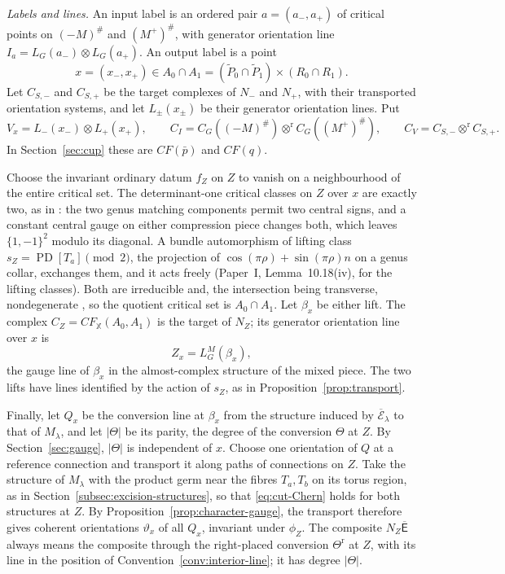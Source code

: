 \documentclass[11pt]{amsart}
\theoremstyle{definition}
\theoremstyle{remark}
\theoremstyle{plain}
\numberwithin{equation}{section}
\newcommand{\CF}{\mathit{CF}}
\newcommand{\PD}{\operatorname{PD}}
\begin{document}
\emph{Labels and lines.} An input label is an ordered pair
$a=(a_-,a_+)$ of critical points on $(-M)^\#$ and $(M^+)^\#$, with
generator orientation line $I_a=L_G(a_-)\otimes L_G(a_+)$. An output label is a
point
\[
 x=(x_-,x_+)\in A_0\cap A_1
   =(\widetilde P_0\cap\widetilde P_1)\times(R_0\cap R_1).
\]
Let $C_{S,-}$ and $C_{S,+}$ be the target complexes of $N_-$ and
$N_+$, with their transported orientation systems, and let
$L_\pm(x_\pm)$ be their generator orientation lines. Put
\[
 V_x=L_-(x_-)\otimes L_+(x_+),\qquad
 C_I=C_G((-M)^\#)\otimes^{\mathrm r}C_G((M^+)^\#),\qquad
 C_V=C_{S,-}\otimes^{\mathrm r}C_{S,+}.
\]
In Section~\ref{sec:cup} these are $\CF(\bar p)$ and $\CF(q)$.

Choose the invariant ordinary datum $f_Z$ on $Z$ to vanish on a
neighbourhood of the entire critical set. The determinant-one critical classes on $Z$ over $x$ are exactly
two, as in \cite[Lemmas~2.43 and~2.45]{DFL}: the two genus matching
components permit two central signs, and a constant central gauge on
either compression piece changes both, which leaves $\{1,-1\}^2$
modulo its diagonal. A bundle automorphism of lifting class
$s_Z=\PD[T_a]\pmod2$, the projection of $\cos(\pi\rho)+\sin(\pi\rho)n$
on a genus collar, exchanges them, and it acts freely
(Paper~I, Lemma~10.18(iv), for the lifting classes). Both are irreducible
\cite[Lemma~2.43 and the discussion after (2.44)]{DFL} and, the intersection being
transverse, nondegenerate \cite[Lemma~2.47]{DFL}, so the quotient critical set is
$A_0\cap A_1$. Let $\beta_x$ be either
lift. The complex $C_Z=\CF_{\mathbb X}(A_0,A_1)$ is the target of $N_Z$; its
generator orientation line over $x$ is
\[
 Z_x=L_G^{M}(\beta_x),
\]
the gauge line of $\beta_x$ in the almost-complex structure of the
mixed piece. The two lifts have lines identified by the action of
$s_Z$, as in Proposition~\ref{prop:transport}.

Finally, let $Q_x$ be the conversion line at $\beta_x$ from the
structure induced by $\overline{\mathcal E}_\lambda$ to that of $M_\lambda$, and
let $|\Theta|$ be its parity, the degree of the conversion $\Theta$ at $Z$. By Section~\ref{sec:gauge}, $|\Theta|$ is independent
of $x$. Choose one orientation of $Q$ at a reference connection
and transport it along paths of connections on $Z$. Take the structure of $M_\lambda$ with the product germ near the
fibres $T_a,T_b$ on its torus region, as in Section~\ref{subsec:excision-structures},
so that \eqref{eq:cut-Chern} holds for both structures at $Z$. By
Proposition~\ref{prop:character-gauge}, the transport therefore gives
coherent orientations $\vartheta_x$ of all $Q_x$, invariant under $\phi_Z$. The composite $N_Z\overline{\mathsf E}$
always means the composite through the right-placed conversion
$\Theta^{\mathrm r}$ at $Z$, with its line in the position of
Convention~\ref{conv:interior-line}; it has degree $|\Theta|$.
\end{document}

